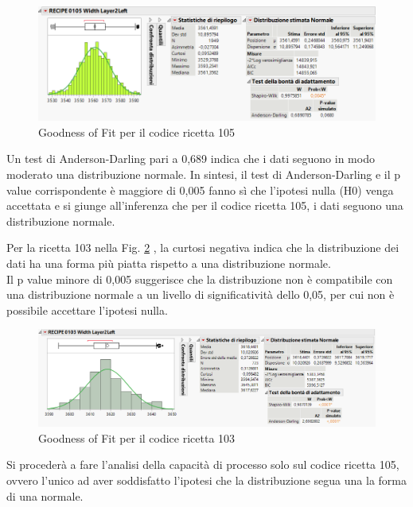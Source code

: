 \begin{figure}[h]
  \centering
  \includegraphics[width=1 \textwidth]{img/Rec105-Normality-Test.png}
  \caption{Goodness of Fit per il codice ricetta 105}
  \label{fig:Rec105-Normality-Test.png}
\end{figure}

Un test di Anderson-Darling pari a 0,689 indica che i dati seguono in modo moderato una distribuzione normale. 
In sintesi, il test di Anderson-Darling e il p value corrispondente è maggiore di 0,005 fanno sì che l'ipotesi nulla (H0) venga accettata e si giunge all'inferenza che per il codice ricetta 105, i dati seguono una distribuzione normale. 


Per la ricetta 103 nella Fig. \ref{fig:Rec103-Normality-Test.png} , la curtosi negativa indica che la distribuzione dei dati ha una forma più piatta rispetto a una distribuzione normale. \\
Il p value minore di 0,005 suggerisce che la distribuzione non è compatibile con una distribuzione normale a un livello di significatività dello 0,05, per cui non è possibile accettare l'ipotesi nulla.


\begin{figure}[h]
  \centering
  \includegraphics[width=1 \textwidth]{img/Rec103-Normality-Test.png}
  \caption{Goodness of Fit per il codice ricetta 103}
  \label{fig:Rec103-Normality-Test.png}
\end{figure}

Si procederà a fare l'analisi della capacità di processo solo sul codice ricetta 105, ovvero l'unico ad aver soddisfatto l'ipotesi che la distribuzione segua una la forma di una normale.


